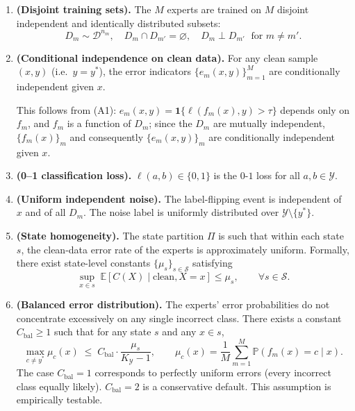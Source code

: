 \begin{enumerate}
\item[\textbf{(A1)}] \textbf{(Disjoint training sets).}
  The $M$ experts are trained on $M$ disjoint independent and identically
  distributed subsets:
  \begin{equation}
  D_m \sim \mathcal{D}^{n_m},\quad D_m \cap D_{m'} = \varnothing,\quad
  D_m \perp D_{m'} \;\text{ for } m \neq m'.
  \label{eq:a1}
  \end{equation}

\item[\textbf{(A2)}] \textbf{(Conditional independence on clean data).}
  For any clean sample $(x,y)$ (i.e.\ $y = y^*$), the error indicators
  $\{e_m(x,y)\}_{m=1}^M$ are conditionally independent given $x$.
  \begin{remark}
  This follows from (A1): $e_m(x,y) = \mathbf{1}\{\ell(f_m(x),y) > \tau\}$
  depends only on $f_m$, and $f_m$ is a function of $D_m$; since the $D_m$
  are mutually independent, $\{f_m(x)\}_m$ and consequently
  $\{e_m(x,y)\}_m$ are conditionally independent given $x$.
  \end{remark}

\item[\textbf{(A3)}] \textbf{(0--1 classification loss).}
  $\ell(a,b) \in \{0,1\}$ is the $0$-$1$ loss for all $a,b \in \mathcal{Y}$.

\item[\textbf{(A4)}] \textbf{(Uniform independent noise).}
  The label-flipping event is independent of $x$ and of all $D_m$. The noise
  label is uniformly distributed over $\mathcal{Y} \setminus \{y^*\}$.

\item[\textbf{(A5)}] \textbf{(State homogeneity).}
  The state partition $\Pi$ is such that within each state $s$, the clean-data
  error rate of the experts is approximately uniform. Formally, there exist
  state-level constants $\{\mu_s\}_{s \in \mathcal{S}}$ satisfying
  \begin{equation}
  \sup_{x \in s} \; \mathbb{E}[C(X) \mid \text{clean}, X = x] \leq \mu_s,
  \qquad \forall s \in \mathcal{S}.
  \label{eq:a5}
  \end{equation}

\item[\textbf{(A6)}] \textbf{(Balanced error distribution).}
  The experts' error probabilities do not concentrate excessively on any
  single incorrect class. There exists a constant $C_{\text{bal}} \geq 1$
  such that for any state $s$ and any $x \in s$,
  \begin{equation}
  \max_{c \neq y^*} \mu_c(x) \;\leq\; C_{\text{bal}} \cdot
  \frac{\mu_s}{K_{\mathcal{Y}} - 1},
  \qquad
  \mu_c(x) = \frac{1}{M}\sum_{m=1}^M \mathbb{P}(f_m(x) = c \mid x).
  \label{eq:a6}
  \end{equation}
  The case $C_{\text{bal}} = 1$ corresponds to perfectly uniform errors
  (every incorrect class equally likely). $C_{\text{bal}} = 2$ is a
  conservative default. This assumption is empirically testable.
\end{enumerate}

